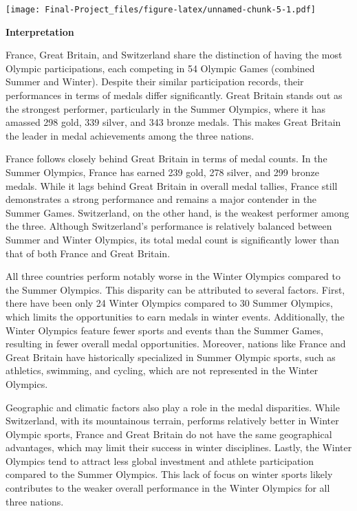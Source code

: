 \documentclass[
]{article}
\begin{document}
\texttt{[image: Final-Project\_files/figure-latex/unnamed-chunk-5-1.pdf]}

\textbf{Interpretation}

France, Great Britain, and Switzerland share the distinction of having
the most Olympic participations, each competing in 54 Olympic Games
(combined Summer and Winter). Despite their similar participation
records, their performances in terms of medals differ significantly.
Great Britain stands out as the strongest performer, particularly in the
Summer Olympics, where it has amassed 298 gold, 339 silver, and 343
bronze medals. This makes Great Britain the leader in medal achievements
among the three nations.

France follows closely behind Great Britain in terms of medal counts. In
the Summer Olympics, France has earned 239 gold, 278 silver, and 299
bronze medals. While it lags behind Great Britain in overall medal
tallies, France still demonstrates a strong performance and remains a
major contender in the Summer Games. Switzerland, on the other hand, is
the weakest performer among the three. Although Switzerland's
performance is relatively balanced between Summer and Winter Olympics,
its total medal count is significantly lower than that of both France
and Great Britain.

All three countries perform notably worse in the Winter Olympics
compared to the Summer Olympics. This disparity can be attributed to
several factors. First, there have been only 24 Winter Olympics compared
to 30 Summer Olympics, which limits the opportunities to earn medals in
winter events. Additionally, the Winter Olympics feature fewer sports
and events than the Summer Games, resulting in fewer overall medal
opportunities. Moreover, nations like France and Great Britain have
historically specialized in Summer Olympic sports, such as athletics,
swimming, and cycling, which are not represented in the Winter Olympics.

Geographic and climatic factors also play a role in the medal
disparities. While Switzerland, with its mountainous terrain, performs
relatively better in Winter Olympic sports, France and Great Britain do
not have the same geographical advantages, which may limit their success
in winter disciplines. Lastly, the Winter Olympics tend to attract less
global investment and athlete participation compared to the Summer
Olympics. This lack of focus on winter sports likely contributes to the
weaker overall performance in the Winter Olympics for all three nations.
\end{document}
